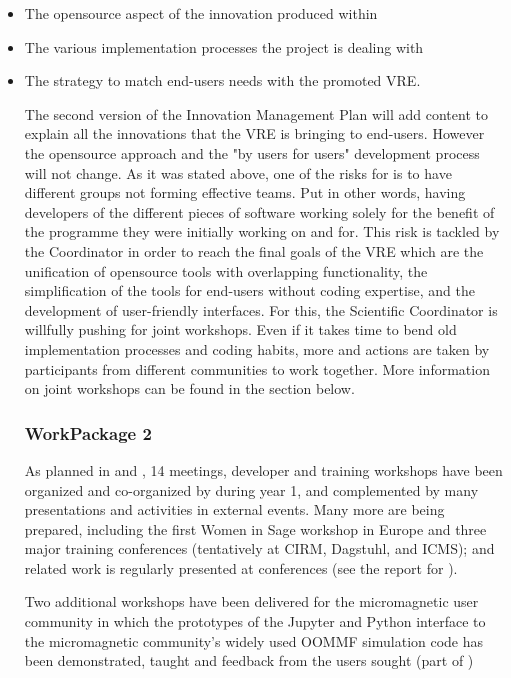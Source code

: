 \documentclass{deliverablereport}
\begin{document}
\begin{itemize}
\item{The opensource aspect of the innovation produced within \ODK}
\item{The various implementation processes the project is dealing with}
\item{The strategy to match end-users needs with the promoted VRE}.

The second version of the Innovation Management Plan will add content to explain all the innovations that the VRE is bringing to end-users. However the opensource approach and the "by users for users" development process will not change.
As it was stated above, one of the risks for \ODK is to have different groups not forming effective teams. Put in other words, having developers of the different pieces of software working solely for the benefit of the programme they were initially working on and for. This risk is tackled by the Coordinator in order to reach the final goals of the VRE which are the unification of opensource tools with overlapping functionality, the simplification of the tools for end-users without coding expertise, and the development of user-friendly interfaces. For this, the Scientific Coordinator is willfully pushing for joint workshops. Even if it takes time to bend old implementation processes and coding habits, more and actions are taken by \ODK participants from different communities to work together. More information on joint workshops can be found in the section below.


\subsubsection{WorkPackage 2}

As planned in  and
, 14 meetings, developer and
training workshops have been organized and co-organized by \ODK during
year 1, and complemented by many presentations and activities in
external events.  Many more are being prepared, including the first
Women in Sage workshop in Europe and three major training conferences
(tentatively at CIRM, Dagstuhl, and ICMS); \ODK and \ODK related work
is regularly presented at conferences (see the report for
).

Two additional workshops have been delivered for the micromagnetic user community
in which the prototypes of the Jupyter and Python interface to the
micromagnetic community's widely used OOMMF simulation code has been demonstrated,
taught and feedback from the users sought (part of
)


\end{itemize}
\end{document}
